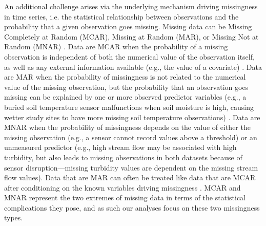 \documentclass[12pt,english]{article} %
\begin{document}
\begin{linenumbers}
\begin{spacing}{1.9}
\begin{flushleft}
\hspace{1em} An additional challenge arises via the underlying mechanism driving missingness in time series, i.e. the statistical relationship between observations and the probability that a given observation goes missing. Missing data can be Missing Completely at Random (MCAR), Missing at Random (MAR), or Missing Not at Random (MNAR) \citep[][Appendix S1: Fig. S1]{rubin_inference_1976, nakagawa_missing_2015}. Data are MCAR when the probability of a missing observation is independent of both the numerical value of the observation itself, as well as any external information available (e.g., the value of a covariate) \citep{nakagawa_missing_2015, horton2007much, newman_missing_2014}. %
Data are MAR when the probability of missingness is not related to the numerical value of the missing observation, but the probability that an observation goes missing can be explained by one or more observed predictor variables (e.g., a buried soil temperature sensor malfunctions when soil moisture is high, causing wetter study sites to have more missing soil temperature observations) \citep{newman_missing_2014, ellington_using_2015, nakagawa_missing_2015}. Data are MNAR when the probability of missingness depends on the value of either the missing observation (e.g., a sensor cannot record values above a threshold) or an unmeasured predictor (e.g., high stream flow may be associated with high turbidity, but also leads to missing observations in both datasets because of sensor disruption---missing turbidity values are dependent on the missing stream flow values). Data that are MAR can often be treated like data that are MCAR after conditioning on the known variables driving missingness \citep{nakagawa_missing_2015, nakagawa_model_2011}.
MCAR and MNAR represent the two extremes of missing data in terms of the statistical complications they pose, and as such our analyses focus on these two missingness types.



\end{flushleft}
\end{spacing}
\end{linenumbers}
\end{document}
